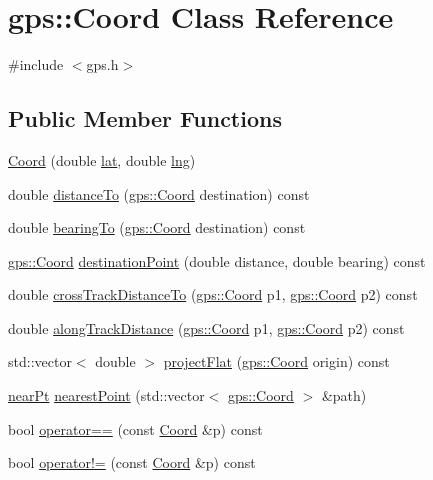 \hypertarget{classgps_1_1Coord}{}\section{gps\+:\+:Coord Class Reference}
\label{classgps_1_1Coord}


{\ttfamily \#include $<$gps.\+h$>$}

\subsection*{Public Member Functions}
\begin{DoxyCompactItemize}
\item 
\hyperlink{classgps_1_1Coord_afcc45fae837b48cd7d9bd545c4dc574c}{Coord} (double \hyperlink{classgps_1_1Coord_a17cbbd7580a83c42f650b8f93e14d98e}{lat}, double \hyperlink{classgps_1_1Coord_abca98aaabe2dc3cf50ebdd687c2f47e8}{lng})
\item 
double \hyperlink{classgps_1_1Coord_a21be4f425a5575531e56ccd8c70be0fa}{distance\+To} (\hyperlink{classgps_1_1Coord}{gps\+::\+Coord} destination) const 
\item 
double \hyperlink{classgps_1_1Coord_ae11512ff67ea20ae1eddf59c5b0b6e70}{bearing\+To} (\hyperlink{classgps_1_1Coord}{gps\+::\+Coord} destination) const 
\item 
\hyperlink{classgps_1_1Coord}{gps\+::\+Coord} \hyperlink{classgps_1_1Coord_a6d463e7e0462c6b1fc02cd64a252071a}{destination\+Point} (double distance, double bearing) const 
\item 
double \hyperlink{classgps_1_1Coord_a42aa2b02ec1ac102154f29f6e8f0e9d5}{cross\+Track\+Distance\+To} (\hyperlink{classgps_1_1Coord}{gps\+::\+Coord} p1, \hyperlink{classgps_1_1Coord}{gps\+::\+Coord} p2) const 
\item 
double \hyperlink{classgps_1_1Coord_a684f2e39962e95b02a612b8cd0a8bd99}{along\+Track\+Distance} (\hyperlink{classgps_1_1Coord}{gps\+::\+Coord} p1, \hyperlink{classgps_1_1Coord}{gps\+::\+Coord} p2) const 
\item 
std\+::vector$<$ double $>$ \hyperlink{classgps_1_1Coord_ad388be3d1aa1c3b6c868b4256cd00284}{project\+Flat} (\hyperlink{classgps_1_1Coord}{gps\+::\+Coord} origin) const 
\item 
\hyperlink{structgps_1_1nearPt}{near\+Pt} \hyperlink{classgps_1_1Coord_a4b7faf8c9e2b4196bcbb450b5448c36f}{nearest\+Point} (std\+::vector$<$ \hyperlink{classgps_1_1Coord}{gps\+::\+Coord} $>$ \&path)
\item 
bool \hyperlink{classgps_1_1Coord_a6e0f9d8bff57711675b435ca75fc6183}{operator==} (const \hyperlink{classgps_1_1Coord}{Coord} \&p) const 
\item 
bool \hyperlink{classgps_1_1Coord_ac472964776941984f42d1dad1160eae6}{operator!=} (const \hyperlink{classgps_1_1Coord}{Coord} \&p) const 
\end{DoxyCompactItemize}
